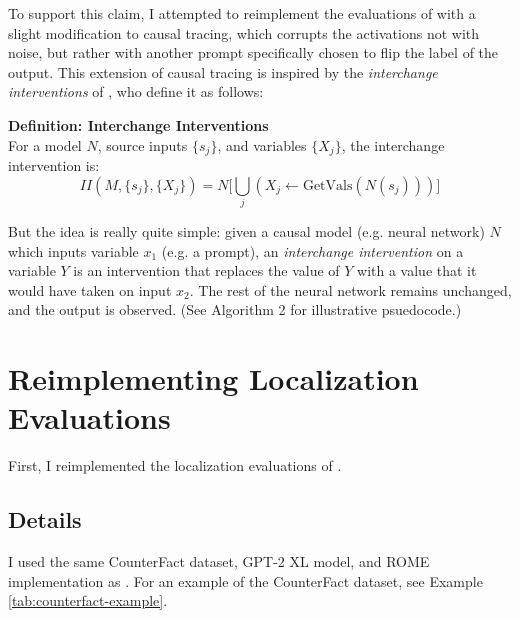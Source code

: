 \documentclass{article}
\begin{document}
To support this claim, I attempted to reimplement the evaluations of \cite{hase2023does} with a slight modification to causal tracing, which corrupts the activations not with noise, but rather with another prompt specifically chosen to flip the label of the output. This extension of causal tracing is inspired by the \emph{interchange interventions} of \cite{geiger2023finding,wu2023interpretability}, who define it as follows:

\textbf{Definition: Interchange Interventions}\\
For a model \( N \), source inputs \( \{s_j\} \), and variables \( \{X_j\} \), the interchange intervention is:
\[ II(M, \{s_j\}, \{X_j\}) = N\Bigg[ \bigcup_{j} (X_j \leftarrow \text{GetVals}(N(s_j))) \Bigg] \]

But the idea is really quite simple: given a causal model (e.g. neural network) $N$ which inputs variable $x_1$ (e.g. a prompt), an \emph{interchange intervention} on a variable $Y$ is an intervention that replaces the value of $Y$ with a value that it would have taken on input $x_2$. The rest of the neural network remains unchanged, and the output is observed. (See Algorithm 2 for illustrative psuedocode.)

\section{Reimplementing Localization Evaluations}
First, I reimplemented the localization evaluations of \cite{hase2023does}. 

\subsection{Details}

I used the same CounterFact dataset, GPT-2 XL model, and ROME implementation as \cite{meng2022locating}. 
For an example of the CounterFact dataset, see Example \ref{tab:counterfact-example}.
\end{document}
